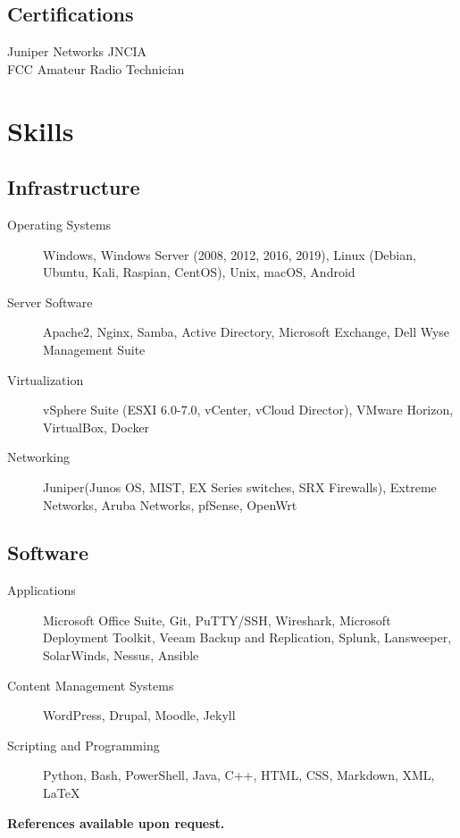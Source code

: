 \documentclass{article}
\begin{document}
\begin{samepage}
\begin{minipage}[t]{.35\textwidth}
			\subsection*{Certifications}
			Juniper Networks JNCIA \\
			FCC Amateur Radio Technician
		\end{minipage}%
		
		\section{Skills}
		
		\subsection{Infrastructure}
		\begin{description}
			\item[Operating Systems] Windows, Windows Server (2008, 2012, 2016, 2019), Linux (Debian, Ubuntu, Kali, Raspian, CentOS), Unix,  macOS, Android
			\item[Server Software] Apache2, Nginx, Samba, Active Directory, Microsoft Exchange, Dell Wyse Management Suite
			\item[Virtualization] vSphere Suite (ESXI 6.0-7.0, vCenter, vCloud Director), VMware Horizon, VirtualBox, Docker
			\item[Networking] Juniper(Junos OS, MIST, EX Series switches, SRX Firewalls), Extreme Networks, Aruba Networks, pfSense, OpenWrt
		\end{description}
		
		\subsection{Software}
		
		\begin{description}
			\item[Applications] Microsoft Office Suite, Git, PuTTY/SSH, Wireshark, Microsoft Deployment Toolkit, Veeam Backup and Replication, Splunk, Lansweeper, SolarWinds, Nessus, Ansible
			\item[Content Management Systems] WordPress, Drupal, Moodle, Jekyll
			\item[Scripting and Programming] Python, Bash, PowerShell, Java, C++, HTML, CSS, Markdown, XML, {\LaTeX}
		\end{description}
		
		
		\begin{center}
			\textbf{References available upon request.}
		\end{center}
		
		\thispagestyle{empty}
	\end{samepage}
\end{document}
